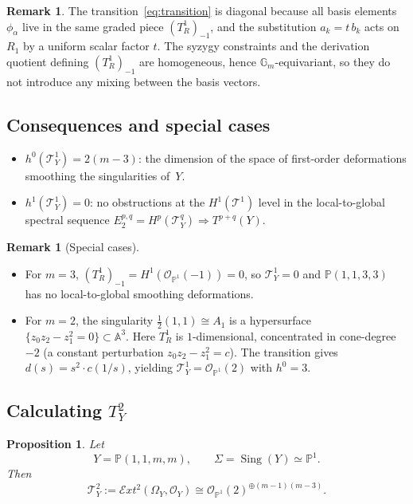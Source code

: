 \documentclass[11pt,twoside]{amsart}
\theoremstyle{plain}
\numberwithin{equation}{section}
\newtheorem{proposition}[theorem]{Proposition}
\newcommand{\OO}{\mathcal{O}}
\newcommand{\PP}{\mathbb{P}}
\newcommand{\AAA}{\mathbb{A}}
\newcommand{\Tt}{\mathcal{T}}
\theoremstyle{definition}
\newtheorem{remark}[theorem]{Remark}
\DeclareMathOperator{\Sing}{Sing}
\begin{document}
\begin{remark}
The transition~\eqref{eq:transition} is diagonal because all basis elements $\phi_\alpha$ live in the same graded piece $(T^1_R)_{-1}$, and the substitution $a_k = t\, b_k$ acts on $R_1$ by a uniform scalar factor $t$. The syzygy constraints and the derivation quotient defining $(T^1_R)_{-1}$ are homogeneous, hence $\mathbb{G}_m$-equivariant, so they do not introduce any mixing between the basis vectors.
\end{remark}
 
\subsection{Consequences and special cases}
 
\begin{itemize}
\item $h^0(\Tt^1_Y) = 2(m-3)$: the dimension of the space of first-order deformations smoothing the singularities of~$Y$.
\item $h^1(\Tt^1_Y) = 0$: no obstructions at the $H^1(\Tt^1)$ level in the local-to-global spectral sequence $E_2^{p,q} = H^p(\Tt^q_Y) \Rightarrow T^{p+q}(Y)$.
\end{itemize}
 
\begin{remark}[Special cases]\leavevmode
\begin{itemize}
\item For $m = 3$, $(T^1_R)_{-1} = H^1(\OO_{\PP^1}(-1)) = 0$, so $\Tt^1_Y = 0$ and $\PP(1,1,3,3)$ has no local-to-global smoothing deformations.
\item For $m = 2$, the singularity $\frac{1}{2}(1,1) \cong A_1$ is a hypersurface $\{z_0 z_2 - z_1^2 = 0\} \subset \AAA^3$. Here $T^1_R$ is $1$-dimensional, concentrated in cone-degree $-2$ (a constant perturbation $z_0 z_2 - z_1^2 = c$). The transition gives $d(s) = s^2 \cdot c(1/s)$, yielding $\Tt^1_Y = \OO_{\PP^1}(2)$ with $h^0 = 3$.
\end{itemize}
\end{remark}

\subsection{Calculating $T_Y^2$}

\begin{proposition}\label{prop:TY2-wps-1122m}
Let
\[
Y=\PP(1,1,m,m),
\qquad
\Sigma=\Sing(Y)\simeq \PP^1.
\]
Then
\[
\mathcal{T}^2_Y:=\mathcal{E}xt^2(\Omega_Y,\OO_Y)
\cong
\OO_{\PP^1}(2)^{\oplus (m-1)(m-3)}.
\]
\end{proposition}
\end{document}
